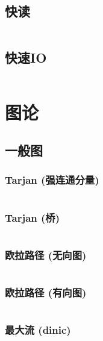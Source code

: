 \documentclass{article}
\begin{document}
\subsection{快读}
\inputminted[breaklines, frame=single]{c++}{../algo/杂项/快读.cpp}


\subsection{快速IO}
\inputminted[breaklines, frame=single]{c++}{../algo/杂项/快速IO.cpp}

\section{图论} %

\subsection{一般图}

\subsubsection{Tarjan (强连通分量)} %
\inputminted[breaklines, frame=single]{c++}{../algo/图论/tarjan【强连通分量】.cpp}

\subsubsection{Tarjan (桥)} %
\inputminted[breaklines, frame=single]{c++}{../algo/图论/tarjan【桥】.cpp}


\subsubsection{欧拉路径 (无向图)} %
\inputminted[breaklines, frame=single]{c++}{../algo/图论/欧拉路径【无向图】.cpp}

\subsubsection{欧拉路径 (有向图)} %
\inputminted[breaklines, frame=single]{c++}{../algo/图论/欧拉路径【有向图】.cpp}



\subsubsection{最大流 (dinic)} %
\inputminted[breaklines, frame=single]{c++}{../algo/图论/网络流/dinic.cpp}
\end{document}
